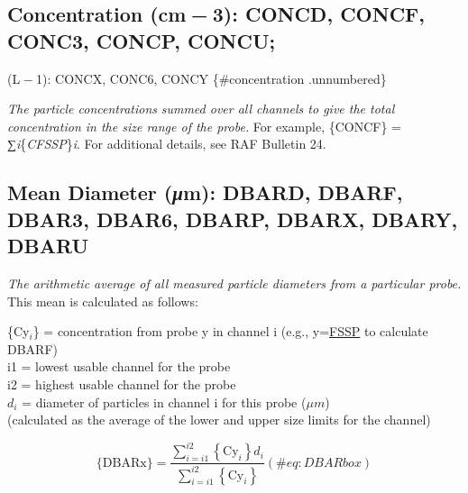 \documentclass[
  english,
]{book}
\begin{document}
\hypertarget{concentration-cm-3-concd-concf-conc3-concp-concu}{%
\subsection{\texorpdfstring{Concentration (cm{ − 3}): CONCD, CONCF,
CONC3, CONCP,
CONCU;}{Concentration (cm − 3): CONCD, CONCF, CONC3, CONCP, CONCU;}}\label{concentration-cm-3-concd-concf-conc3-concp-concu}}

(L{ − 1}): CONCX, CONC6, CONCY \{\#concentration .unnumbered\}

\emph{The particle concentrations} \emph{summed over all channels to
give the total concentration in the size range of the probe.} For
example, \{CONCF\} = {∑\emph{i}\{\emph{CFSSP}\}\emph{i}}. For additional
details, see RAF Bulletin 24.

\hypertarget{mean-diameter}{%
\subsection*{\texorpdfstring{Mean Diameter ({\emph{μ}}m): DBARD, DBARF,
DBAR3, DBAR6, DBARP, DBARX, DBARY,
DBARU}{Mean Diameter (μm): DBARD, DBARF, DBAR3, DBAR6, DBARP, DBARX, DBARY, DBARU}}\label{mean-diameter}}

\emph{The arithmetic average of all measured particle diameters from a
particular probe.} This mean is calculated as follows:

\{Cy\(_{i}\)\} =
concentration
from probe y in channel i \hspace{0.6cm}(e.g.,
y=\protect\hyperlink{size-distribution}{FSSP} to calculate DBARF)\\
i1 = lowest usable channel for the probe\\
i2 = highest usable channel for the probe\\
\(d_{i}\)
= diameter of particles in channel i for this probe (\(\mu m\))\\
\hspace*{0.6cm}(calculated as the average of the lower and upper size
limits for the channel)

\begin{equation}
\mathrm{\{DBARx\}}=\frac{{\textstyle \sum_{i=i1}^{i2}}{\displaystyle {\displaystyle \left\{ \mathrm{Cy}_{i}\right\} d_{i}}}}{\sum_{i=i1}^{i2}\left\{ \mathrm{Cy}_{i}\right\} }
(\#eq:DBARbox)
\end{equation}
\end{document}
